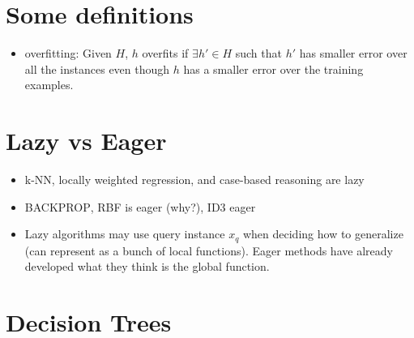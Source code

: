 \documentclass[11pt]{article}
\begin{document}
\tableofcontents

\medskip                        %



\section{Some definitions}
\begin{itemize}
\item overfitting: Given $H$, $h$ overfits if $\exists h' \in H$ such that $h'$ has smaller error over all the instances even though $h$ has a smaller error over the training examples.
\end{itemize}

\section{Lazy vs Eager}
\begin{itemize}
\item k-NN, locally weighted regression, and case-based reasoning are lazy
\item \textsc{BACKPROP}, RBF is eager (why?), ID3 eager
\item Lazy algorithms may use query instance $x_q$ when deciding how to generalize (can represent as a bunch of local functions). Eager methods have already developed what they think is the global function.
\end{itemize}

\section{Decision Trees}
\end{document}

